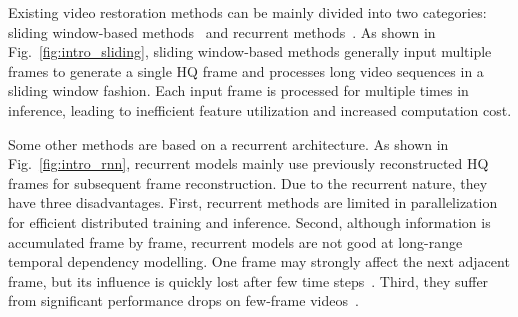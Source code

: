 \documentclass[10pt,twocolumn,letterpaper]{article}
\newlength \g
\begin{document}
Existing video restoration methods can be mainly divided into two categories: sliding window-based methods~\cite{caballero2017VESPCN, huang2017video, wang2019edvr, tian2020tdan, li2020mucan, su2017dvddeblur, zhou2019spatio, isobe2020tga, li2021arvo} and recurrent methods~\cite{huang2015bidirectional, sajjadi2018FRVSR, fuoli2019rlsp, haris2019recurrent, isobe2020rsdn, isobe2020rrn, chan2021basicvsr, chan2021basicvsr++, lin2021fdan, nah2019recurrent, zhong2020efficient, son2021recurrent}. As shown in Fig.~\ref{fig:intro_sliding}, sliding window-based methods generally input multiple frames to generate a single HQ frame and processes long video sequences in a sliding window fashion. Each input frame is processed for multiple times in inference, leading to inefficient feature utilization and increased computation cost. 

Some other methods are based on a recurrent architecture. As shown in Fig.~\ref{fig:intro_rnn}, recurrent models mainly use previously reconstructed HQ frames for subsequent frame reconstruction. Due to the recurrent nature, they have three disadvantages. First, recurrent methods are limited in parallelization for efficient distributed training and inference. Second, although information is accumulated frame by frame, recurrent models are not good at long-range temporal dependency modelling. One frame may strongly affect the next adjacent frame, but its influence is quickly lost after few time steps~\cite{greaves2019statistical, vaswani2017transformer}. Third, they suffer from significant performance drops on few-frame videos~\cite{cao2021videosr}.
\end{document}
